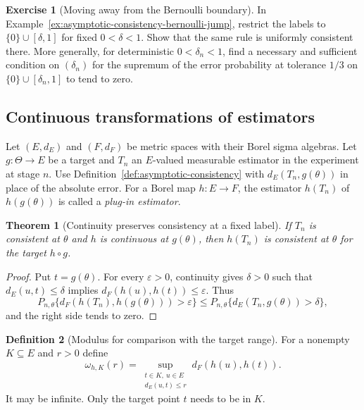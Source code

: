 \documentclass[11pt,oneside]{book}
\newtheorem{theorem}{Theorem}[chapter]
\theoremstyle{definition}
\newtheorem{definition}[theorem]{Definition}
\newtheorem{exercise}{Exercise}[section]
\theoremstyle{remark}
\begin{document}
\begin{exercise}[Moving away from the Bernoulli boundary]
\label{exer:asymptotic-consistency-bernoulli-away-from-zero}
In Example~\ref{ex:asymptotic-consistency-bernoulli-jump}, restrict
the labels to $\{0\}\cup[\delta,1]$ for fixed $0<\delta<1$.
Show that the same rule is uniformly consistent there. More
generally, for deterministic $0<\delta_n<1$, find a necessary
and sufficient condition on $(\delta_n)$ for the supremum of the
error probability at tolerance $1/3$ on $\{0\}\cup[\delta_n,1]$
to tend to zero.
\end{exercise}

\subsection{Continuous transformations of estimators}
\label{subsec:asymptotic-continuous-transformations}

Let $(E,d_E)$ and $(F,d_F)$ be metric spaces with their Borel
sigma algebras. Let $g:\Theta\to E$ be a target and $T_n$ an
$E$-valued measurable estimator in the experiment at stage $n$.
Use Definition~\ref{def:asymptotic-consistency} with $d_E(T_n,g(\theta))$
in place of the absolute error. For a Borel map $h:E\to F$,
the estimator $h(T_n)$ of $h(g(\theta))$ is called a
\emph{plug-in estimator}.

\begin{theorem}[Continuity preserves consistency at a fixed label]
\label{thm:asymptotic-consistency-continuous-map}
If $T_n$ is consistent at $\theta$ and $h$ is continuous at
$g(\theta)$, then $h(T_n)$ is consistent at $\theta$ for the
target $h\circ g$.
\end{theorem}
\begin{proof}
Put $t=g(\theta)$. For every $\varepsilon>0$, continuity gives
$\delta>0$ such that $d_E(u,t)\leq\delta$ implies
$d_F(h(u),h(t))\leq\varepsilon$. Thus
\[
P_{n,\theta}\{d_F(h(T_n),h(g(\theta)))>\varepsilon\}
\leq P_{n,\theta}\{d_E(T_n,g(\theta))>\delta\},
\]
and the right side tends to zero.
\end{proof}

\begin{definition}[Modulus for comparison with the target range]
\label{def:asymptotic-transform-modulus}
For a nonempty $K\subseteq E$ and $r>0$ define
\[
\omega_{h,K}(r)
=\sup_{\substack{t\in K,\ u\in E\\ d_E(u,t)\leq r}}
d_F(h(u),h(t)).
\]
It may be infinite. Only the target point $t$ needs to be in $K$.
\end{definition}
\end{document}
